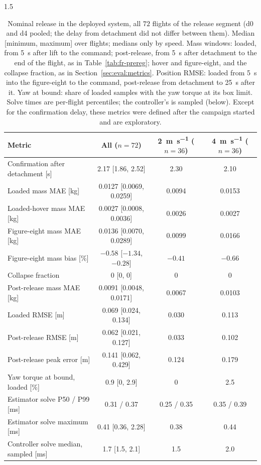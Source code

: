 \begin{spacing}{1.5}
\begin{table}[ht]
\centering
\caption[Continuous results of nominal release in the deployed system]{Nominal
release in the deployed system, all $72$ flights of the release segment (d0 and
d4 pooled; the delay from detachment did not differ between them). Median
[minimum, maximum] over flights; medians only by speed. Mass windows: loaded, from \SI{5}{\second}
after lift to the command; post-release, from \SI{5}{\second} after detachment
to the end of the flight, as in Table~\ref{tab:fr-prereg}; hover and
figure-eight, and the collapse fraction, as in Section~\ref{sec:eval:metrics}. Position RMSE: loaded from \SI{5}{\second} into the
figure-eight to the command, post-release from detachment to \SI{25}{\second}
after it. Yaw at bound: share of loaded samples with the yaw torque at its box
limit. Solve times are per-flight percentiles; the controller's is sampled
(below). Except for the confirmation delay, these metrics were defined after the
campaign started and are exploratory.}
\label{tab:dep-release}
\footnotesize
\setlength{\tabcolsep}{3pt}
\begin{tabular}{@{}l c c c@{}}
\toprule
\textbf{Metric} & \textbf{All ($n=72$)} & \textbf{\SI{2}{\meter\per\second} ($n=36$)} & \textbf{\SI{4}{\meter\per\second} ($n=36$)} \\
\midrule
Confirmation after detachment [s] & 2.17 [1.86, 2.52] & 2.30 & 2.10 \\
Loaded mass MAE [kg]              & 0.0127 [0.0069, 0.0259] & 0.0094 & 0.0153 \\
Loaded-hover mass MAE [kg]        & 0.0027 [0.0008, 0.0036] & 0.0026 & 0.0027 \\
Figure-eight mass MAE [kg]        & 0.0136 [0.0070, 0.0289] & 0.0099 & 0.0166 \\
Figure-eight mass bias [\%]       & $-0.58$ [$-1.34$, $-0.28$] & $-0.41$ & $-0.66$ \\
Collapse fraction                 & 0 [0, 0] & 0 & 0 \\
Post-release mass MAE [kg]        & 0.0091 [0.0048, 0.0171] & 0.0067 & 0.0103 \\
Loaded RMSE [m]                   & 0.069 [0.024, 0.134] & 0.030 & 0.113 \\
Post-release RMSE [m]             & 0.062 [0.021, 0.127] & 0.033 & 0.102 \\
Post-release peak error [m]       & 0.141 [0.062, 0.429] & 0.124 & 0.179 \\
Yaw torque at bound, loaded [\%]  & 0.9 [0, 2.9] & 0 & 2.5 \\
Estimator solve P50 / P99 [ms]    & 0.31 / 0.37 & 0.25 / 0.35 & 0.35 / 0.39 \\
Estimator solve maximum [ms]      & 0.41 [0.36, 2.28] & 0.38 & 0.44 \\
Controller solve median, sampled [ms] & 1.7 [1.5, 2.1] & 1.5 & 2.0 \\
\bottomrule
\end{tabular}
\end{table}


\end{spacing}
